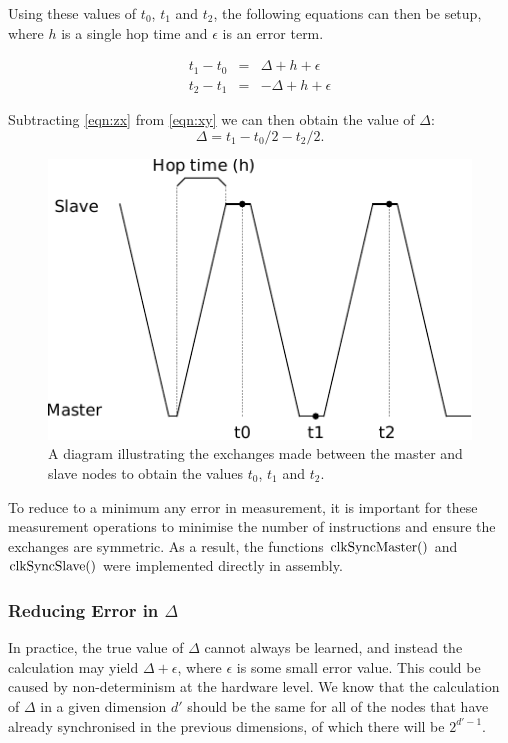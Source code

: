 Using these values of $t_0$, $t_1$ and $t_2$, the following equations can then
be setup, where $h$ is a single hop time and $\epsilon$ is an error term.

\begin{eqnarray}
t_1 - t_0 & = & \Delta + h + \epsilon \label{eqn:xy}\\
t_2 - t_1 & = & -\Delta + h + \epsilon \label{eqn:zx}
\end{eqnarray}

\noindent
Subtracting \ref{eqn:zx} from \ref{eqn:xy} we can then obtain the value of
$\Delta$: $$\Delta = t_1 - t_0/2 - t_2/2.$$

\begin{figure}
\centering
\includegraphics[scale=1]{../images/pingpong.pdf}
\caption{A diagram illustrating the exchanges made between the master and slave
nodes to obtain the values $t_0$, $t_1$ and $t_2$.}
\label{fig:pingpong}
\end{figure}

To reduce to a minimum any error in measurement, it is important for these
measurement operations to minimise the number of instructions and ensure the
exchanges are symmetric. As a result, the functions $\mathop{\mathrm{clkSyncMaster}()}$ and
$\mathop{\mathrm{clkSyncSlave}()}$ were implemented directly in assembly.

\subsubsection{Reducing Error in $\Delta$}

In practice, the true value of $\Delta$ cannot always be learned, and instead the
calculation may yield $\Delta + \epsilon$, where $\epsilon$ is some small error
value. This could be caused by non-determinism at the hardware level.  We know that the
calculation of $\Delta$ in a given dimension $d'$ should be the same for all of
the nodes that have already synchronised in the previous dimensions, of which
there will be $2^{d'-1}$. 

